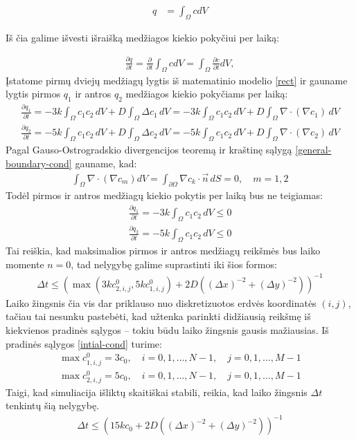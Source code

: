 \begin{align}
  q&=\int_\Omega c dV \label{quantity-general}
\end{align}

Iš čia galime išvesti išraišką medžiagos kiekio pokyčiui per laiką:

\begin{align}
  \frac{\partial q}{\partial t}=\frac{\partial}{\partial t}\int_\Omega c dV=\int_\Omega\frac{\partial c}{\partial t}dV,
\end{align}
\newpage
Įstatome pirmų dviejų medžiagų lygtis iš matematinio modelio \eqref{rect} ir gauname lygtis pirmos $q_1$ ir antros $q_2$ medžiagos kiekio pokyčiams per laiką:
\begin{align}
  \frac{\partial q_1}{\partial t}=-3k\int_\Omega c_1c_2\,dV + D\int_\Omega \Delta c_1\,dV=-3k\int_\Omega c_1c_2\,dV + D\int_\Omega \nabla \cdot (\nabla c_1)\,dV\\
  \frac{\partial q_2}{\partial t}=-5k\int_\Omega c_1c_2\,dV + D\int_\Omega \Delta c_2\,dV=-5k\int_\Omega c_1c_2\,dV + D\int_\Omega \nabla \cdot (\nabla c_2)\,dV
\end{align}
Pagal Gauso-Ostrogradskio divergencijos teoremą ir kraštinę sąlygą \eqref{general-boundary-cond} gauname, kad:
\begin{align}\label{no-q-change}
\int_\Omega \nabla \cdot (\nabla c_m) dV = \int_{\partial\Omega} \nabla c_k \cdot \vec{n}\, dS = 0,\quad m=1,2
\end{align}
Todėl pirmos ir antros medžiagų kiekio pokytis per laiką bus ne teigiamas:
\begin{subequations} \label{negative-quantity}
\begin{align}
  \frac{\partial q_1}{\partial t}=-3k\int_\Omega c_1c_2\,dV \leqslant 0\\
  \frac{\partial q_2}{\partial t}=-5k\int_\Omega c_1c_2\,dV\leqslant 0
\end{align}
\end{subequations}
Tai reiškia, kad maksimalios pirmos ir antros medžiagų reikšmės bus laiko momente $n=0$, tad nelygybę galime suprastinti iki šios formos:
\begin{align}
  \Delta t \leqslant \left(\max(3kc^{0}_{2,i,j}, 5kc^{0}_{1,i,j})+2D\left((\Delta x)^{-2}+(\Delta y)^{-2}\right)\right)^{-1}
\end{align}
Laiko žingsnis čia vis dar priklauso nuo diskretizuotos erdvės koordinatės $(i, j)$, tačiau tai nesunku pastebėti, kad užtenka parinkti didžiausią reikšmę iš kiekvienos pradinės sąlygos -- tokiu būdu laiko žingsnis gausis mažiausias. Iš pradinės sąlygos \eqref{intial-cond} turime:
\begin{align*}
\max c^0_{1,i,j}=3c_0,\quad i=0,1,\dots,N-1, \quad j=0,1,\dots,M-1\\
\max c^0_{2,i,j}=5c_0,\quad i=0,1,\dots,N-1, \quad j=0,1,\dots,M-1
\end{align*}
Taigi, kad simuliacija išliktų skaitiškai stabili, reikia, kad laiko žingsnis $\Delta t$ tenkintų šią nelygybę.
\begin{align}
  \Delta t \leqslant \left(15kc_0+2D\left((\Delta x)^{-2}+(\Delta y)^{-2}\right)\right)^{-1}\label{numerical-stability-condition}
\end{align}

